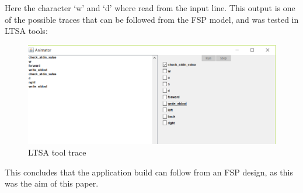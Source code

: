 Here the character `w' and `d' where read from the input line. This
output is one of the possible traces that can be followed from the FSP
model, and was tested in LTSA tools:

\begin{figure}
\centering
\includegraphics{../img/ltsa_output.png}
\caption{LTSA tool trace}
\end{figure}

This concludes that the application build can follow from an FSP design,
as this was the aim of this paper.

